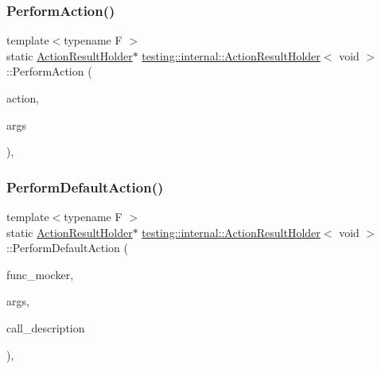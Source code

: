\subsubsection{\texorpdfstring{Perform\+Action()}{PerformAction()}}
{\footnotesize\ttfamily template$<$typename F $>$ \\
static \hyperlink{classtesting_1_1internal_1_1_action_result_holder}{Action\+Result\+Holder}$\ast$ \hyperlink{classtesting_1_1internal_1_1_action_result_holder}{testing\+::internal\+::\+Action\+Result\+Holder}$<$ void $>$\+::Perform\+Action (\begin{DoxyParamCaption}\item[{const \hyperlink{classtesting_1_1_action}{Action}$<$ F $>$ \&}]{action,  }\item[{const typename \hyperlink{structtesting_1_1internal_1_1_function}{Function}$<$ F $>$\+::Argument\+Tuple \&}]{args }\end{DoxyParamCaption})\hspace{0.3cm}{\ttfamily [inline]}, {\ttfamily [static]}}

\mbox{\label{classtesting_1_1internal_1_1_action_result_holder_3_01void_01_4_a140b6ab6a756e60db62e76b01b09a26f}} 
\subsubsection{\texorpdfstring{Perform\+Default\+Action()}{PerformDefaultAction()}}
{\footnotesize\ttfamily template$<$typename F $>$ \\
static \hyperlink{classtesting_1_1internal_1_1_action_result_holder}{Action\+Result\+Holder}$\ast$ \hyperlink{classtesting_1_1internal_1_1_action_result_holder}{testing\+::internal\+::\+Action\+Result\+Holder}$<$ void $>$\+::Perform\+Default\+Action (\begin{DoxyParamCaption}\item[{const \hyperlink{classtesting_1_1internal_1_1_function_mocker_base}{Function\+Mocker\+Base}$<$ F $>$ $\ast$}]{func\+\_\+mocker,  }\item[{const typename \hyperlink{structtesting_1_1internal_1_1_function}{Function}$<$ F $>$\+::Argument\+Tuple \&}]{args,  }\item[{const \hyperlink{namespacetesting_1_1internal_a8e8ff5b11e64078831112677156cb111}{string} \&}]{call\+\_\+description }\end{DoxyParamCaption})\hspace{0.3cm}{\ttfamily [inline]}, {\ttfamily [static]}}

